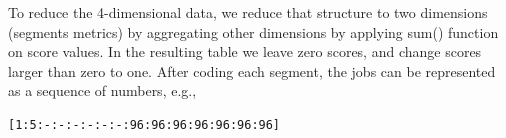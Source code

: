 \documentclass{jhps}
\begin{document}

To reduce the 4-dimensional data, we reduce that structure to two dimensions (segments metrics) by aggregating other dimensions by applying sum() function on score values.
In the resulting table we leave zero scores, and change scores larger than zero to one.
After coding each segment, the jobs can be represented as a sequence of numbers, e.g.,

\begin{lstlisting}[caption={B-coding of a 15 segments long job.}]
[1:5:-:-:-:-:-:-:96:96:96:96:96:96:96]
\end{lstlisting}
\end{document}
